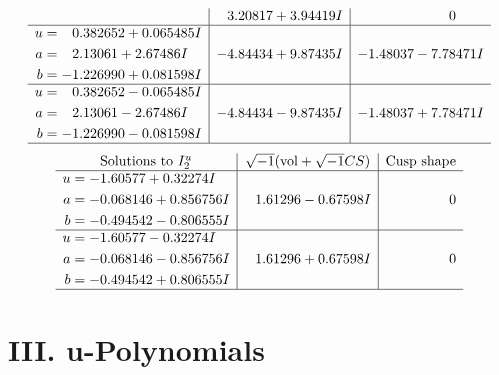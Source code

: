 \documentclass[1p]{elsarticle_modified}
\theoremstyle{definition}
\newcommand{\I}{\sqrt{-1}}
\begin{document}
$$\begin{array}{c|c|c}
 & \phantom{-}3.20817 + 3.94419 I & \phantom{-0.000000 } 0 \\ \hline\begin{aligned}
u &= \phantom{-}0.382652 + 0.065485 I \\
a &= \phantom{-}2.13061 + 2.67486 I \\
b &= -1.226990 + 0.081598 I\end{aligned}
 & -4.84434 + 9.87435 I & -1.48037 - 7.78471 I \\ \hline\begin{aligned}
u &= \phantom{-}0.382652 - 0.065485 I \\
a &= \phantom{-}2.13061 - 2.67486 I \\
b &= -1.226990 - 0.081598 I\end{aligned}
 & -4.84434 - 9.87435 I & -1.48037 + 7.78471 I\\
 \hline 
 \end{array}$$\newpage$$\begin{array}{c|c|c}  
\text{Solutions to }I^u_{2}& \I (\text{vol} + \sqrt{-1}CS) & \text{Cusp shape}\\
 \hline 
\begin{aligned}
u &= -1.60577 + 0.32274 I \\
a &= -0.068146 + 0.856756 I \\
b &= -0.494542 - 0.806555 I\end{aligned}
 & \phantom{-}1.61296 - 0.67598 I & \phantom{-0.000000 } 0 \\ \hline\begin{aligned}
u &= -1.60577 - 0.32274 I \\
a &= -0.068146 - 0.856756 I \\
b &= -0.494542 + 0.806555 I\end{aligned}
 & \phantom{-}1.61296 + 0.67598 I & \phantom{-0.000000 } 0\\
 \hline 
 \end{array}$$\newpage
\newpage\renewcommand{\arraystretch}{1}
\centering \section*{ III. u-Polynomials}
\end{document}
